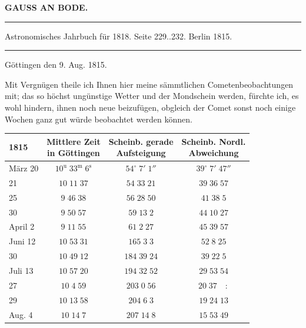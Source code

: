 \clearpage{}\hypertarget{native-392-lower}{}\label{native-392-lower}
\begin{center}\textbf{GAUSS AN BODE.}\par\vspace{4pt}\hrule\vspace{4pt}\fontsize{10}{12}\selectfont Astronomisches Jahrbuch für 1818. Seite 229..232. Berlin 1815.\par\vspace{4pt}\hrule\vspace{4pt}\end{center}

\begin{flushright}
Göttingen den 9. Aug. 1815.
\end{flushright}

\par\indent Mit Vergnügen theile ich Ihnen hier meine sämmtlichen Cometenbeobachtungen mit; das so höchst
ungünstige Wetter und der Mondschein werden, fürchte ich, es wohl hindern, ihnen noch neue
beizufügen, obgleich der Comet sonst noch einige Wochen ganz gut würde beobachtet werden können.

\begin{center}\fontsize{10}{12}\selectfont\setlength{\tabcolsep}{5pt}\renewcommand{\arraystretch}{1.15}\begin{tabular}{l|c|c|c}
1815 & \shortstack{Mittlere Zeit\\in Göttingen} & \shortstack{Scheinb. gerade\\Aufsteigung} & \shortstack{Scheinb. Nordl.\\Abweichung}\\\hline
März 20 & $10^{\mathrm u}\;33^{\mathrm m}\;6^{\mathrm s}$ & $54^\circ\;7'\;1''$ & $39^\circ\;7'\;47''$\\
21 & $10\;11\;37$ & $54\;33\;21$ & $39\;36\;57$\\
25 & $9\;46\;38$ & $56\;28\;50$ & $41\;38\;5$\\
30 & $9\;50\;57$ & $59\;13\;2$ & $44\;10\;27$\\
April 2 & $9\;11\;55$ & $61\;2\;27$ & $45\;39\;57$\\
Juni 12 & $10\;53\;31$ & $165\;3\;3$ & $52\;8\;25$\\
30 & $10\;49\;12$ & $184\;39\;24$ & $39\;22\;5$\\
Juli 13 & $10\;57\;20$ & $194\;32\;52$ & $29\;53\;54$\\
27 & $10\;4\;59$ & $203\;0\;56$ & $20\;37\quad:$\\
29 & $10\;13\;58$ & $204\;6\;3$ & $19\;24\;13$\\
Aug. 4 & $10\;14\;7$ & $207\;14\;8$ & $15\;53\;49$\\
\end{tabular}\end{center}

